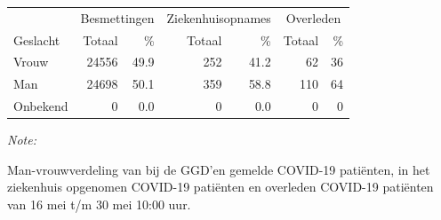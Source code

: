 \documentclass[
  english,
  man,floatsintext]{apa6}
\begin{document}
\begin{table}
\centering\begingroup\fontsize{11}{13}\selectfont

\begin{threeparttable}
\begin{tabular}{lrrrrrr}
\toprule
\multicolumn{1}{c}{ } & \multicolumn{2}{c}{Besmettingen} & \multicolumn{2}{c}{Ziekenhuisopnames} & \multicolumn{2}{c}{Overleden} \\
\cmidrule(l{3pt}r{3pt}){2-3} \cmidrule(l{3pt}r{3pt}){4-5} \cmidrule(l{3pt}r{3pt}){6-7}
Geslacht & Totaal & \% & Totaal & \% & Totaal & \%\\
\midrule
Vrouw & 24556 & 49.9 & 252 & 41.2 & 62 & 36\\
Man & 24698 & 50.1 & 359 & 58.8 & 110 & 64\\
Onbekend & 0 & 0.0 & 0 & 0.0 & 0 & 0\\
\bottomrule
\end{tabular}
\begin{tablenotes}
\item \textit{Note: } 
\item Man-vrouwverdeling van bij de GGD’en gemelde COVID-19 patiënten, in het ziekenhuis opgenomen COVID-19 patiënten en overleden COVID-19 patiënten van 16 mei t/m 30 mei 10:00 uur.
\end{tablenotes}
\end{threeparttable}
\endgroup{}
\end{table}
\newpage
\end{document}
